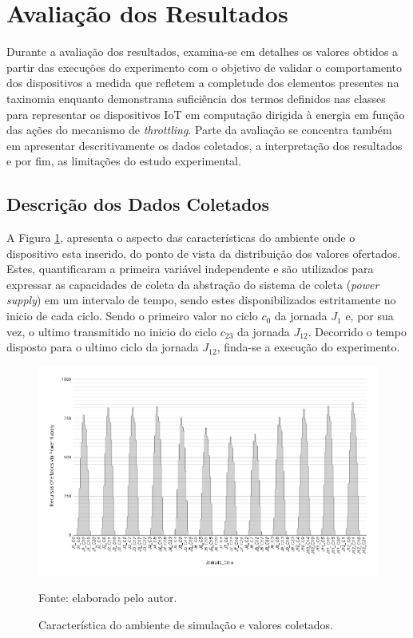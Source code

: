 \section{Avaliação dos Resultados}
\label{cap6:avaliacao}

Durante a avaliação dos resultados, examina-se em detalhes os valores obtidos a partir das execuções do experimento com o objetivo de validar o comportamento dos dispositivos a medida que refletem a completude dos elementos presentes na taxinomia enquanto demonstrama suficiência dos termos definidos nas classes para representar os dispositivos \acs{IoT} em computação dirigida à energia em função das ações do mecanismo de \textit{throttling}. Parte da avaliação se concentra também em apresentar descritivamente os dados coletados, a interpretação dos resultados e por fim, as limitações do estudo experimental.

\subsection{Descrição dos Dados Coletados}

A Figura \ref{fig:cap6valoresofertados}, apresenta o aspecto das características do ambiente onde o dispositivo esta inserido, do ponto de vista da distribuição dos valores ofertados. Estes, quantificaram a primeira variável independente e são utilizados para expressar as capacidades de coleta da abstração do sistema de coleta (\textit{power supply}) em um intervalo de tempo, sendo estes disponibilizados estritamente no inicio de cada ciclo. Sendo o primeiro valor no ciclo $c_{0}$ da jornada $J_1$ e, por sua vez, o ultimo transmitido no inicio do ciclo $c_{23}$ da jornada $J_{12}$. Decorrido o tempo disposto para o ultimo ciclo da jornada $J_{12}$, finda-se a execução do experimento.

\begin{figure}[H]
	\centering
	
	\caption{Característica do ambiente de simulação e valores coletados.} 
	\label{fig:cap6valoresofertados}
	\noindent\includegraphics[width=1\linewidth]{Imagens/cap6/cap6valoresofertados.png} 
	
	Fonte: elaborado pelo autor.
\end{figure}

